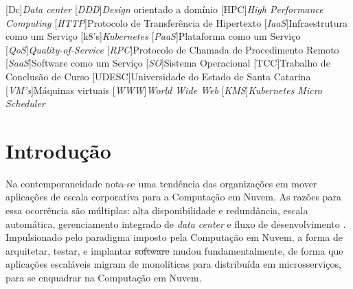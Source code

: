 \documentclass[
	12pt,				%
	openright,			%
	oneside,			%
	a4paper,			%
	brazil				%
	]{abntex2}
\providecommand{\DIFaddtex}[1]{{\protect\color{blue}\uwave{#1}}} %
\providecommand{\DIFdeltex}[1]{{\protect\color{red}\sout{#1}}}                      %
\providecommand{\DIFaddbegin}{} %
\providecommand{\DIFaddend}{} %
\providecommand{\DIFdelbegin}{} %
\providecommand{\DIFdelend}{} %
\providecommand{\DIFadd}[1]{\texorpdfstring{\DIFaddtex{#1}}{#1}} %
\providecommand{\DIFdel}[1]{\texorpdfstring{\DIFdeltex{#1}}{}} %
\newcommand{\DIFscaledelfig}{0.5}
\newlength{\DIFdelgraphicswidth} %
\newlength{\DIFdelgraphicsheight} %
\newcommand{\DIFaddincludegraphics}[2][]{{\color{blue}\fbox{\DIFOincludegraphics[#1]{#2}}}} %
\newcommand{\DIFdelincludegraphics}[2][]{%
\sbox{\DIFdelgraphicsbox}{\DIFOincludegraphics[#1]{#2}}%
\settoboxwidth{\DIFdelgraphicswidth}{\DIFdelgraphicsbox} %
\settoboxtotalheight{\DIFdelgraphicsheight}{\DIFdelgraphicsbox} %
\scalebox{\DIFscaledelfig}{%
\parbox[b]{\DIFdelgraphicswidth}{\usebox{\DIFdelgraphicsbox}\\[-\baselineskip] \rule{\DIFdelgraphicswidth}{0em}}\llap{\resizebox{\DIFdelgraphicswidth}{\DIFdelgraphicsheight}{%
\setlength{\unitlength}{\DIFdelgraphicswidth}%
\begin{picture}(1,1)%
\thicklines\linethickness{2pt} %
{\color[rgb]{1,0,0}\put(0,0){\framebox(1,1){}}}%
{\color[rgb]{1,0,0}\put(0,0){\line( 1,1){1}}}%
{\color[rgb]{1,0,0}\put(0,1){\line(1,-1){1}}}%
\end{picture}%
}\hspace*{3pt}}} %
} %
\DeclareRobustCommand{\DIFaddbegin}{\DIFOaddbegin \let\includegraphics\DIFaddincludegraphics} %
\DeclareRobustCommand{\DIFaddend}{\DIFOaddend \let\includegraphics\DIFOincludegraphics} %
\DeclareRobustCommand{\DIFdelbegin}{\DIFOdelbegin \let\includegraphics\DIFdelincludegraphics} %
\DeclareRobustCommand{\DIFdelend}{\DIFOaddend \let\includegraphics\DIFOincludegraphics} %
\begin{document}
\pretextualchapter{\listadesiglasname}
\begin{acronym}
    \large
	[Dc]{\it Data center}
	[\textit{DDD}]{\textit{Design} orientado a domínio}
	[HPC]{\textit{High Performance Computing}}
	[\textit{HTTP}]{Protocolo de Transferência de Hipertexto}
	[\textit{IaaS}]{Infraestrutura como um Serviço}
	[k8's]{\textit{Kubernetes}}
	[\textit{PaaS}]{Plataforma como um Serviço}
	[\textit{QoS}]{\textit{Quality-of-Service}}
	[\textit{RPC}]{Protocolo de Chamada de Procedimento Remoto}
	[\textit{SaaS}]{Software como um Serviço}
	[\textit{SO}]{Sistema Operacional}
	[TCC]{Trabalho de Conclusão de Curso}
	[UDESC]{Universidade do Estado de Santa Catarina}
	[\textit{VM's}]{Máquinas virtuais}
	[\textit{WWW}]{\textit{World Wide Web}}
	[\textit{KMS}]{\textit{Kubernetes Micro Scheduler}}
\end{acronym}
\cleardoublepage

\tableofcontents*
\cleardoublepage



\textual

\chapter{Introdução}
Na contemporaneidade nota-se uma tendência das organizações em mover aplicações de escala corporativa para a Computação em Nuvem. As razões para essa ocorrência são múltiplas: alta disponibilidade e redundância, escala automática, gerenciamento integrado de \textit{data center} e fluxo de desenvolvimento \cite{Fritzsch}. Impulsionado pelo paradigma imposto pela Computação em Nuvem, a forma de arquitetar, testar, e implantar \DIFdelbegin \DIFdel{software }\DIFdelend \DIFaddbegin \textit{\DIFadd{software}} \DIFaddend mudou fundamentalmente, de forma que aplicações escaláveis migram de monolíticas para distribuída em microsserviços, para se enquadrar na Computação em Nuvem.
\end{document}
